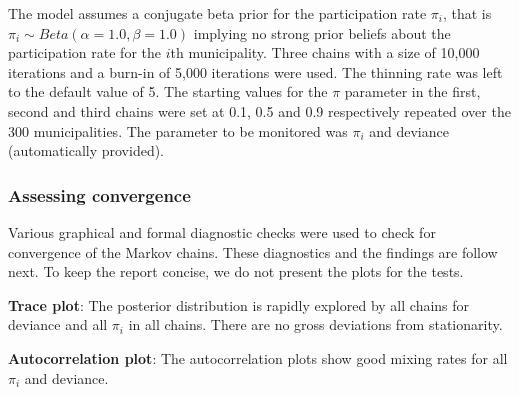 \documentclass[12pt]{article}
\begin{document}

The model assumes a conjugate beta prior for the participation rate $\pi_i$, that is $\pi_{i} \sim Beta(\alpha=1.0, \beta=1.0)$ implying no strong prior beliefs about the participation rate for the $i$th municipality. Three chains with a size of 10,000 iterations and a burn-in of 5,000 iterations were used. The thinning rate was left to the default value of 5. The starting values for the $\pi$ parameter in the first, second and third chains were set at 0.1, 0.5 and 0.9 respectively repeated over the 300 municipalities. The parameter to be monitored was $\pi_i$ and deviance (automatically provided).  

\subsubsection{Assessing convergence}

Various graphical and formal diagnostic checks were used to check for convergence of the Markov chains. These diagnostics and the findings are follow next. To keep the report concise, we do not present the plots for the tests. 

\textbf{Trace plot}: The posterior distribution is rapidly explored by all chains for deviance and all $\pi_i$ in all chains. There are no gross deviations from stationarity. 


    

\textbf{Autocorrelation plot}: The autocorrelation plots show good mixing rates for all $\pi_i$ and deviance.
\end{document}
